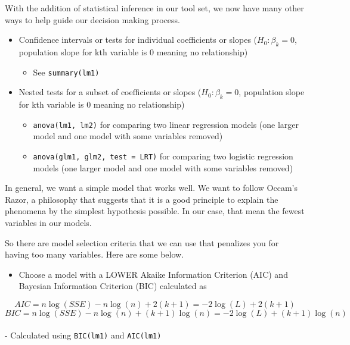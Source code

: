\documentclass[]{book}
\providecommand{\tightlist}{%
  \setlength{\itemsep}{0pt}\setlength{\parskip}{0pt}}
\begin{document}
With the addition of statistical inference in our tool set, we now have many other ways to help guide our decision making process.

\begin{itemize}
\tightlist
\item
  Confidence intervals or tests for individual coefficients or slopes (\(H_0: \beta_k = 0\), population slope for kth variable is 0 meaning no relationship)

  \begin{itemize}
  \tightlist
  \item
    See \texttt{summary(lm1)}
  \end{itemize}
\item
  Nested tests for a subset of coefficients or slopes (\(H_0: \beta_k = 0\), population slope for kth variable is 0 meaning no relationship)

  \begin{itemize}
  \tightlist
  \item
    \texttt{anova(lm1,\ lm2)} for comparing two linear regression models (one larger model and one model with some variables removed)
  \item
    \texttt{anova(glm1,\ glm2,\ test\ =\ \textquotesingle{}LRT\textquotesingle{})} for comparing two logistic regression models (one larger model and one model with some variables removed)
  \end{itemize}
\end{itemize}

In general, we want a simple model that works well. We want to follow Occam's Razor, a philosophy that suggests that it is a good principle to explain the phenomena by the simplest hypothesis possible. In our case, that mean the fewest variables in our models.

So there are model selection criteria that we can use that penalizes you for having too many variables. Here are some below.

\begin{itemize}
\tightlist
\item
  Choose a model with a LOWER Akaike Information Criterion (AIC) and Bayesian Information Criterion (BIC) calculated as
\end{itemize}

\[AIC = n\log(SSE) - n\log(n) + 2(k+1) = -2\log(L) + 2(k+1)\]
\[BIC = n\log(SSE) -n\log(n) + (k+1)\log(n)= -2\log(L) + (k+1)\log(n)\]\\
- Calculated using \texttt{BIC(lm1)} and \texttt{AIC(lm1)}
\end{document}

